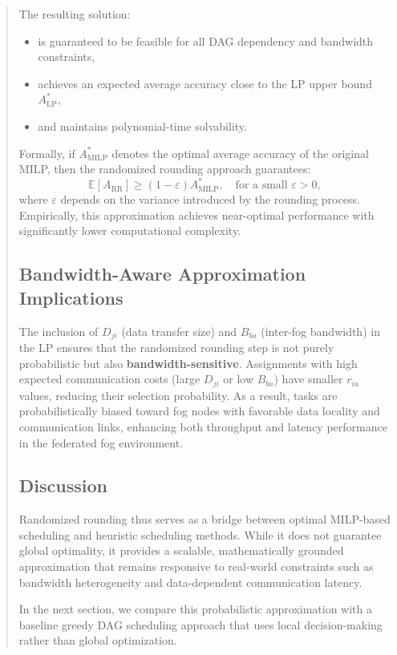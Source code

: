 \documentclass[conference]{IEEEtran}
\begin{document}
\begin{abstract}
The resulting solution:
\begin{itemize}
    \item is guaranteed to be feasible for all DAG dependency and bandwidth constraints,
    \item achieves an expected average accuracy close to the LP upper bound \( A_{\text{LP}}^* \),
    \item and maintains polynomial-time solvability.
\end{itemize}

Formally, if \( A_{\text{MILP}}^* \) denotes the optimal average accuracy of the original MILP, then the randomized rounding approach guarantees:
\[
\mathbb{E}[A_{\text{RR}}] \geq (1 - \varepsilon) A_{\text{MILP}}^*, \quad \text{for a small } \varepsilon > 0,
\]
where \( \varepsilon \) depends on the variance introduced by the rounding process.  
Empirically, this approximation achieves near-optimal performance with significantly lower computational complexity.

\subsection{Bandwidth-Aware Approximation Implications}

The inclusion of \( D_{ji} \) (data transfer size) and \( B_{ba} \) (inter-fog bandwidth) in the LP ensures that the randomized rounding step is not purely probabilistic but also \textbf{bandwidth-sensitive}.  
Assignments with high expected communication costs (large \( D_{ji} \) or low \( B_{ba} \)) have smaller \( r_{ia} \) values, reducing their selection probability.  
As a result, tasks are probabilistically biased toward fog nodes with favorable data locality and communication links, enhancing both throughput and latency performance in the federated fog environment.

\subsection{Discussion}

Randomized rounding thus serves as a bridge between optimal MILP-based scheduling and heuristic scheduling methods.  
While it does not guarantee global optimality, it provides a scalable, mathematically grounded approximation that remains responsive to real-world constraints such as bandwidth heterogeneity and data-dependent communication latency.

In the next section, we compare this probabilistic approximation with a baseline greedy DAG scheduling approach that uses local decision-making rather than global optimization.



\end{abstract}
\end{document}
